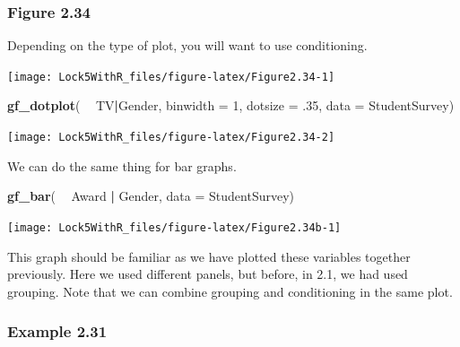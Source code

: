 \documentclass[]{book}
\newenvironment{Shaded}{\begin{snugshade}}{\end{snugshade}}
\newcommand{\DataTypeTok}[1]{\textcolor[rgb]{0.13,0.29,0.53}{#1}}
\newcommand{\DecValTok}[1]{\textcolor[rgb]{0.00,0.00,0.81}{#1}}
\newcommand{\FloatTok}[1]{\textcolor[rgb]{0.00,0.00,0.81}{#1}}
\newcommand{\KeywordTok}[1]{\textcolor[rgb]{0.13,0.29,0.53}{\textbf{#1}}}
\newcommand{\NormalTok}[1]{#1}
\newcommand{\OperatorTok}[1]{\textcolor[rgb]{0.81,0.36,0.00}{\textbf{#1}}}
\newcommand{\StringTok}[1]{\textcolor[rgb]{0.31,0.60,0.02}{#1}}
\begin{document}
\hypertarget{figure-2.34}{%
\subsubsection{Figure 2.34}\label{figure-2.34}}

Depending on the type of plot, you will want to use conditioning.

\begin{Shaded}
\end{Shaded}

\texttt{[image: Lock5WithR\_files/figure-latex/Figure2.34-1]}

\begin{Shaded}
\begin{Highlighting}[]
\KeywordTok{gf_dotplot}\NormalTok{( }\OperatorTok{~}\StringTok{ }\NormalTok{TV}\OperatorTok{|}\NormalTok{Gender, }\DataTypeTok{binwidth =} \DecValTok{1}\NormalTok{, }\DataTypeTok{dotsize =} \FloatTok{.35}\NormalTok{, }\DataTypeTok{data =}\NormalTok{ StudentSurvey)}
\end{Highlighting}
\end{Shaded}

\texttt{[image: Lock5WithR\_files/figure-latex/Figure2.34-2]}

We can do the same thing for bar graphs.

\begin{Shaded}
\begin{Highlighting}[]
\KeywordTok{gf_bar}\NormalTok{( }\OperatorTok{~}\StringTok{ }\NormalTok{Award }\OperatorTok{|}\StringTok{ }\NormalTok{Gender, }\DataTypeTok{data =}\NormalTok{ StudentSurvey)}
\end{Highlighting}
\end{Shaded}

\texttt{[image: Lock5WithR\_files/figure-latex/Figure2.34b-1]}

This graph should be familiar as we have plotted these variables together previously. Here we used different panels, but before, in 2.1, we had used grouping. Note that we can combine grouping and conditioning in the same plot.

\hypertarget{example-2.31}{%
\subsubsection{Example 2.31}\label{example-2.31}}
\end{document}
